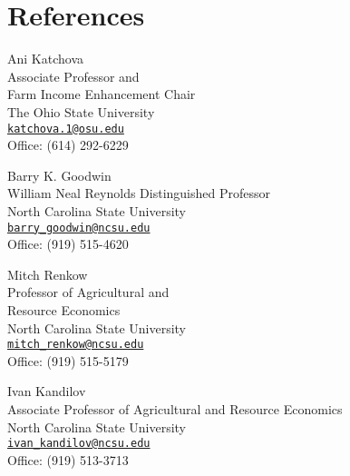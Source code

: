 \documentclass[letterpaper]{article}
\renewenvironment{itemize}{
  \begin{list}{}{
    \setlength{\leftmargin}{1.5em}
  }
}{
  \end{list}
}
\begin{document}
\newpage

\section*{References}

\begin{multicols}{2}
\begin{itemize}
\item Ani Katchova \\ Associate Professor and \\ Farm Income Enhancement Chair \\ The Ohio State University \\ \href{mailto:katchova.1@osu.edu}{\tt katchova.1@osu.edu} \\ Office: (614) 292-6229
\item Barry K. Goodwin \\ William Neal Reynolds Distinguished Professor \\ North Carolina State University \\ \href{mailto:barry\_goodwin@ncsu.edu}{\tt barry\_goodwin@ncsu.edu} \\ Office: (919) 515-4620

\item Mitch Renkow \\ Professor of Agricultural and \\ Resource Economics \\ North Carolina State University \\ \href{mailto:mitch\_renkow@ncsu.edu}{\tt mitch\_renkow@ncsu.edu} \\ Office: (919) 515-5179
\item Ivan Kandilov \\ Associate Professor of Agricultural and Resource Economics \\ North Carolina State University \\ \href{mailto:ivan\_kandilov@ncsu.edu}{\tt ivan\_kandilov@ncsu.edu} \\ Office: (919) 513-3713
\end{itemize}
\end{multicols}
\end{document}
